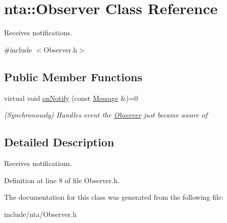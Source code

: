 \hypertarget{classnta_1_1Observer}{}\section{nta\+:\+:Observer Class Reference}
\label{classnta_1_1Observer}


Receives notifications.  




{\ttfamily \#include $<$Observer.\+h$>$}

\subsection*{Public Member Functions}
\begin{DoxyCompactItemize}
\item 
\mbox{\label{classnta_1_1Observer_af12cc337d76d1ca8a7f49edbb465eaa6}} 
virtual void \hyperlink{classnta_1_1Observer_af12cc337d76d1ca8a7f49edbb465eaa6}{on\+Notify} (const \hyperlink{structnta_1_1Message}{Message} \&)=0
\begin{DoxyCompactList}\small\item\em (Synchronously) Handles event the \hyperlink{classnta_1_1Observer}{Observer} just became aware of \end{DoxyCompactList}\end{DoxyCompactItemize}


\subsection{Detailed Description}
Receives notifications. 

Definition at line 8 of file Observer.\+h.



The documentation for this class was generated from the following file\+:\begin{DoxyCompactItemize}
\item 
include/nta/Observer.\+h\end{DoxyCompactItemize}
